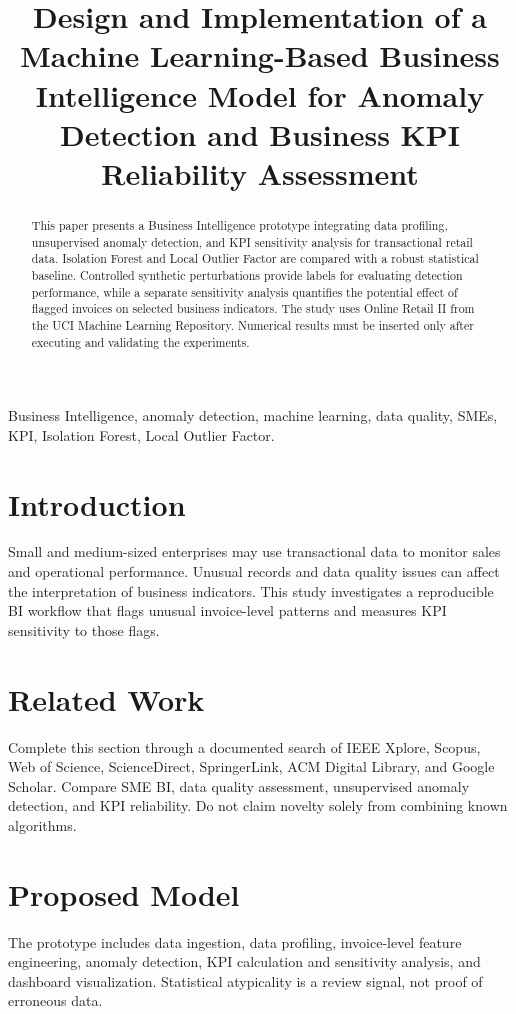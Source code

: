 \documentclass[conference]{IEEEtran}
\title{Design and Implementation of a Machine Learning-Based Business Intelligence Model for Anomaly Detection and Business KPI Reliability Assessment}
\author{\IEEEauthorblockN{Author Name}\IEEEauthorblockA{Institution\\City, Country\\email@example.com}}
\begin{document}
\maketitle
\begin{abstract}
This paper presents a Business Intelligence prototype integrating data profiling, unsupervised anomaly detection, and KPI sensitivity analysis for transactional retail data. Isolation Forest and Local Outlier Factor are compared with a robust statistical baseline. Controlled synthetic perturbations provide labels for evaluating detection performance, while a separate sensitivity analysis quantifies the potential effect of flagged invoices on selected business indicators. The study uses Online Retail II from the UCI Machine Learning Repository. Numerical results must be inserted only after executing and validating the experiments.
\end{abstract}
\begin{IEEEkeywords}
Business Intelligence, anomaly detection, machine learning, data quality, SMEs, KPI, Isolation Forest, Local Outlier Factor.
\end{IEEEkeywords}
\section{Introduction}
Small and medium-sized enterprises may use transactional data to monitor sales and operational performance. Unusual records and data quality issues can affect the interpretation of business indicators. This study investigates a reproducible BI workflow that flags unusual invoice-level patterns and measures KPI sensitivity to those flags.
\section{Related Work}
Complete this section through a documented search of IEEE Xplore, Scopus, Web of Science, ScienceDirect, SpringerLink, ACM Digital Library, and Google Scholar. Compare SME BI, data quality assessment, unsupervised anomaly detection, and KPI reliability. Do not claim novelty solely from combining known algorithms.
\section{Proposed Model}
The prototype includes data ingestion, data profiling, invoice-level feature engineering, anomaly detection, KPI calculation and sensitivity analysis, and dashboard visualization. Statistical atypicality is a review signal, not proof of erroneous data.
\end{document}

